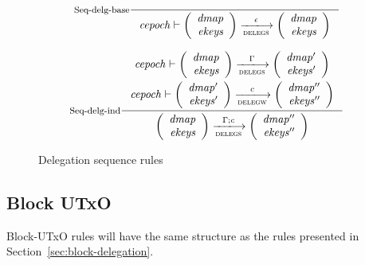 \begin{figure}
  \begin{equation}
    \inference[Seq-delg-base]
    {}
    { \var{cepoch} \vdash \left(
        \begin{array}{r}
          \var{dmap}\\
          \var{ekeys}
        \end{array}
      \right)
        \trans{delegs}{\epsilon}
      \left(
        \begin{array}{r}
          \var{dmap}\\
          \var{ekeys}
        \end{array}
      \right)
    }
    \label{eq:rule:sequence-delegation-base}
  \end{equation}

  \begin{equation}
    \inference[Seq-delg-ind]
    { \var{cepoch} \vdash
      {\left(
        \begin{array}{r}
          \var{dmap}\\
          \var{ekeys}
        \end{array}
      \right)}
      \trans{delegs}{\Gamma}
      {\left(
        \begin{array}{r}
          \var{dmap'}\\
          \var{ekeys'}
        \end{array}
      \right)}
    \\ ~ \\
    \var{cepoch} \vdash
    {\left(
        \begin{array}{r}
          \var{dmap'}\\
          \var{ekeys'}
        \end{array}
      \right)}
      \trans{delegw}{c}
      {\left(
        \begin{array}{r}
          \var{dmap''}\\
          \var{ekeys''}
        \end{array}
      \right)}
    }
    { \left(
        \begin{array}{r}
          \var{dmap}\\
          \var{ekeys}
        \end{array}
      \right)
      \trans{delegs}{\Gamma; c}
      \left(
        \begin{array}{r}
          \var{dmap''}\\
          \var{ekeys''}
        \end{array}
      \right)
    }
    \label{eq:rule:sequence-delegation-inductive}
  \end{equation}
  \caption{Delegation sequence rules}
  \label{fig:rules:delegation-sequence}
\end{figure}

\subsection{Block UTxO}
\label{sec:block-utxo}

\begin{todo}
  Block-UTxO rules will have the same structure as the rules presented in
  Section~\ref{sec:block-delegation}.
\end{todo}
